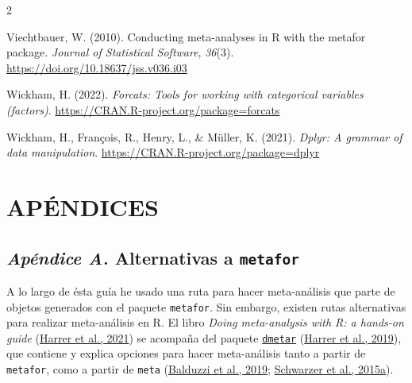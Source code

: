 \documentclass[
  bookmarksnumbered]{article}
\newlength{\cslhangindent}
\newlength{\cslentryspacingunit} %
\newenvironment{CSLReferences}[2] %
 {%
  \setlength{\parindent}{0pt}
  \ifodd #1
  \let\oldpar\par
  \def\par{\hangindent=\cslhangindent\oldpar}
  \fi
  \setlength{\parskip}{#2\cslentryspacingunit}
 }%
 {}
\begin{document}
\begin{multicols}{2}
\begin{CSLReferences}{1}{0}
\leavevmode{}%
Viechtbauer, W. (2010). Conducting meta-analyses in {R} with the metafor package. \emph{Journal of Statistical Software}, \emph{36}(3). \url{https://doi.org/10.18637/jss.v036.i03}

\leavevmode{}%
Wickham, H. (2022). \emph{Forcats: Tools for working with categorical variables (factors)}. \url{https://CRAN.R-project.org/package=forcats}

\leavevmode{}%
Wickham, H., François, R., Henry, L., \& Müller, K. (2021). \emph{Dplyr: A grammar of data manipulation}. \url{https://CRAN.R-project.org/package=dplyr}

\end{CSLReferences}

\end{multicols}
\newpage

\hypertarget{apuxe9ndices}{%
\section*{APÉNDICES}\label{apuxe9ndices}}

\hypertarget{appendix-apuxe9ndice}{%
\appendix}


\opensupplement
\normalsize

\hypertarget{apendice-alt}{%
\subsection*{\texorpdfstring{\emph{Apéndice A.} Alternativas a \texttt{metafor}}{Apéndice A. Alternativas a metafor}}\label{apendice-alt}}

A lo largo de ésta guía he usado una ruta para hacer meta-análisis que parte de objetos generados con el paquete \texttt{metafor}. Sin embargo, existen rutas alternativas para realizar meta-análisis en R. El libro \emph{Doing meta-analysis with R: a hands-on guide} (\protect\hyperlink{ref-harrer2021doing}{Harrer et al., 2021}) se acompaña del paquete \href{https://dmetar.protectlab.org/index.html}{\texttt{dmetar}} (\protect\hyperlink{ref-Harrer2019dmetar}{Harrer et al., 2019}), que contiene y explica opciones para hacer meta-análisis tanto a partir de \texttt{metafor}, como a partir de \texttt{meta} (\protect\hyperlink{ref-BalduzziMeta2019}{Balduzzi et al., 2019}; \protect\hyperlink{ref-schwarzerMetaAnalysis2015}{Schwarzer et al., 2015a}).
\end{document}
